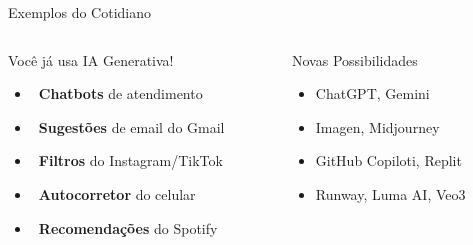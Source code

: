 \documentclass[aspectratio=169,12pt]{beamer}
\begin{document}
\begin{frame}{Exemplos do Cotidiano}
    \begin{columns}
        \begin{column}{0.5\textwidth}
            \begin{exampleblock}{Você já usa IA Generativa!}
                \begin{itemize}
                    \item \faComments\, \textbf{Chatbots} de atendimento
                    \item \faEnvelope\, \textbf{Sugestões} de email do Gmail
                    \item \faCamera\, \textbf{Filtros} do Instagram/TikTok
                    \item \faKeyboard\, \textbf{Autocorretor} do celular
                    \item \faMusic\, \textbf{Recomendações} do Spotify
                \end{itemize}
            \end{exampleblock}
        \end{column}
        \begin{column}{0.5\textwidth}
            \begin{alertblock}{Novas Possibilidades}
                \begin{itemize}
                    \item \textcolor{accent}{\faRobot} ChatGPT, Gemini
                    \item \textcolor{secondary}{\faImage} Imagen, Midjourney
                    \item \textcolor{success}{\faCode} GitHub Copiloti, Replit
                    \item \textcolor{warning}{\faVideo} Runway, Luma AI, Veo3
                \end{itemize}
            \end{alertblock}
        \end{column}
    \end{columns}
\end{frame}
\end{document}
